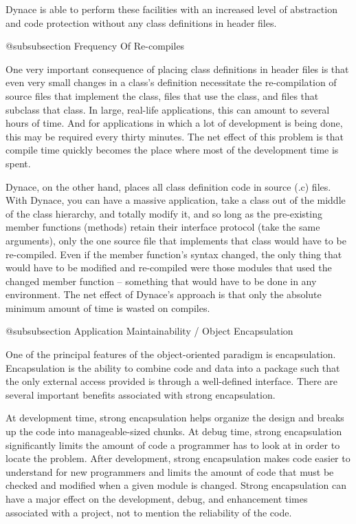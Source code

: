 Dynace is able to perform these facilities with an increased level
of abstraction and code protection without any class definitions
in header files.

@subsubsection Frequency Of Re-compiles

One very important consequence of placing class definitions in header
files is that even very small changes in a class's definition
necessitate the re-compilation of source files that implement the
class, files that use the class, and files that subclass that class.
In large, real-life applications, this can amount to several hours
of time.  And for applications in which a lot of development is
being done, this may be required every thirty minutes.  The net
effect of this problem is that compile time quickly becomes the
place where most of the development time is spent.

Dynace, on the other hand, places all class definition code in
source (.c) files.  With Dynace, you can have a massive application,
take a class out of the middle of the class hierarchy, and totally
modify it, and so long as the pre-existing member functions (methods)
retain their interface protocol (take the same arguments), only the
one source file that implements that class would have to be
re-compiled.  Even if the member function's syntax changed, the only
thing that would have to be modified and re-compiled were those
modules that used the changed member function -- something that would
have to be done in any environment.  The net effect of Dynace's
approach is that only the absolute minimum amount of time is wasted
on compiles.

@subsubsection Application Maintainability / Object Encapsulation

One of the principal features of the object-oriented paradigm is
encapsulation.  Encapsulation is the ability to combine code and data
into a package such that the only external access provided is through
a well-defined interface.  There are several important benefits associated
with strong encapsulation.

At development time, strong encapsulation helps organize the design and
breaks up the code into manageable-sized chunks.  At debug time, strong
encapsulation significantly limits the amount of code a programmer
has to look at in order to locate the problem.  After development,
strong encapsulation makes code easier to understand for new programmers
and limits the amount of code that must be checked and modified when
a given module is changed.  Strong encapsulation can have a major
effect on the development, debug, and enhancement times associated
with a project, not to mention the reliability of the code.


